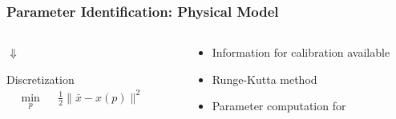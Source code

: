 \begin{frame}
    \frametitle{Parameter Identification: Physical Model}
    \vspace{-1cm}
    \begin{columns}[onlytextwidth]
        \begin{column}{0.5\textwidth}
            \begin{block}{}
                
            \end{block}
            \vspace{-0.1cm}
            
            \centering
            $\Downarrow$
            
            \begin{block}{}
            Discretization
            \small{\begin{align*}
                \min_{p} & & \frac{1}{2} \| \bar{x} - x(p) \|^2 & & \\
            \end{align*}}
            \vspace{-1cm}
            \end{block}
            \vspace{-1.5cm}
        \end{column}
    
    \begin{column}{0.45\textwidth}
        \begin{itemize}
            \vspace{0.6cm}
            \item{Information for calibration available}
            \vspace{0.5cm}
            \item{Runge-Kutta method}
            \vspace{0.5cm}
            \item{Parameter computation for}
        \end{itemize}
    \end{column}    
    \end{columns}
\end{frame}        
        
